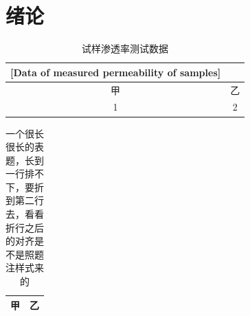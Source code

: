 
\mainmatter
\chapter{绪论}
\begin{longtable}{cc}
  \caption{试样渗透率测试数据}[Data of measured permeability of samples] \\
  \toprule
  甲 & 乙 \\
  \midrule
  1 & 2 \\
  \bottomrule
\end{longtable}
\begin{longtable}{cc}
  \caption{一个很长很长的表题，长到一行排不下，要折到第二行去，看看折行之后的对齐是不是照题注样式来的} \\
  \toprule
  甲 & 乙 \\
  \bottomrule
\end{longtable}
\listoftables


